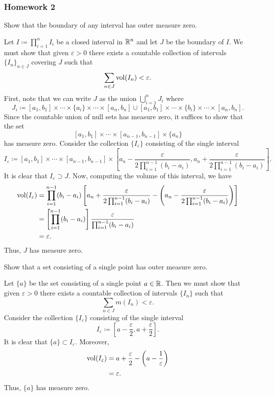 \subsubsection{Homework 2}
\setcounter{exercise}{0}
\begin{problem}
  Show that the boundary of any interval has outer measure zero.
\end{problem}
\begin{solution}
  Let $I\coloneq\prod_{i=1}^n I_i$ be a closed interval in $\mathbb{R}^n$ and let
  $J$ be the boundary of $I$. We must show that given $\varepsilon>0$ there
  exists a countable collection of intervals $\{I_n\}_{n\in J}$ covering
  $J$ such that
  \[
    \sum_{n\in J}\operatorname{vol}(I_n)<\varepsilon.
  \]
  First, note that we can write $J$ as the union $\bigcup_{i=1}^n J_i$
  where
  \[
    J_i\coloneq%
      [a_1,b_1]\times\cdots\times\{a_i\}\times\cdots\times[a_n,b_n]%
    \cup
    [a_1,b_1]\times\cdots\times\{b_i\}\times\cdots\times[a_n,b_n].
  \]
  Since the countable union of null sets has measure zero, it suffices to
  show that the set
  \[
    [a_1,b_1]\times\cdots\times[a_{n-1},b_{n-1}]\times\{a_n\}%
  \]
  has measure zero. Consider the collection $\{I_\varepsilon\}$ consisting
  of the single interval
  \[
    I_\varepsilon\coloneq [a_1,b_1]\times\cdots\times[a_{n-1},b_{n-1}]
    \times\left[a_n-\frac{\varepsilon}{2\prod_{i=1}^{n-1}(b_i-a_i)},
      a_n+\frac{\varepsilon}{2\prod_{i=1}^{n-1}(b_i-a_i)}\right].
  \]
  It is clear that $I_\varepsilon\supset J$. Now, computing the volume of
  this interval, we have
  \begin{align*}
    \vol(I_\varepsilon)%
    &=\prod_{i=1}^{n-1}(b_i-a_i)%
    \left[%
    a_n+\frac{\varepsilon}{2\prod_{i=1}^{n-1}(b_i-a_i)}%
    -\left(%
    a_n -\frac{\varepsilon}{2\prod_{i=1}^{n-1}(b_i-a_i)} \right)
    \right]\\
    &=\left[\prod_{i=1}^{n-1}(b_i-a_i)\right]%
      \frac{\varepsilon}{\prod_{i=1}^{n-1}(b_i-a_i)}\\
    &=\varepsilon.
  \end{align*}
  Thus, $J$ has measure zero.
\end{solution}

\begin{problem}
  Show that a set consisting of a single point has outer measure zero.
\end{problem}
\begin{solution}
  Let $\{a\}$ be the set consisting of a single point $a\in\mathbb{R}$. Then we
  must show that given $\varepsilon>0$ there exists a countable collection
  of intervals $\{I_n\}$ such that
  \[
    \sum_{n\in J} m(I_n)<\varepsilon.
  \]
  Consider the collection $\{I_\varepsilon\}$ consisting of the single
  interval
  \[
    I_\varepsilon\coloneq
    \left[a-\frac{\varepsilon}{2},a+\frac{\varepsilon}{2}\right].
  \]
  It is clear that $\{a\}\subset I_\varepsilon$. Moreover,
  \begin{align*}
    \operatorname{vol}(I_\varepsilon)
    &=a+\frac{\varepsilon}{2}-\left(a-\frac{1}{\varepsilon}\right)\\
    &=\varepsilon.
  \end{align*}
  Thus, $\{a\}$ has measure zero.
\end{solution}

